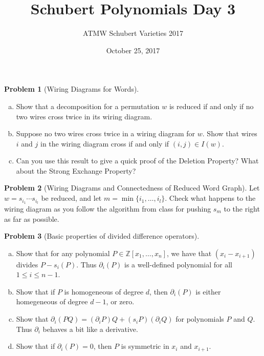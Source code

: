 \documentclass{amsart}
\newcommand{\+}[1]{\ensuremath{\mathbf{#1}}}
\theoremstyle{definition}
\newtheorem{prob}{Problem}
\begin{document}
\title{Schubert Polynomials Day 3}
\date{October 25, 2017}
\author{ATMW Schubert Varieties 2017}

\maketitle

\begin{prob}[Wiring Diagrams for Words]
\begin{enumerate}[(a)]
\item Show that a decomposition for a permutation $w$ is reduced if and only if no two wires cross twice in its wiring diagram.
\item Suppose no two wires cross twice in a wiring diagram for $w$.
Show that wires $i$ and $j$ in the wiring diagram cross if and only if $(i,j) \in I(w)$.
\item Can you use this result to give a quick proof of the Deletion Property? What about the Strong Exchange Property?
\end{enumerate}
\end{prob}


\begin{prob}[Wiring Diagrams and Connectedness of Reduced Word Graph]
Let $w = s_{i_1} \cdots s_{i_l}$ be reduced, and let $m = \min\{i_1,\ldots,i_l\}$.
Check what happens to the wiring diagram as you
follow the algorithm from class for pushing $s_m$ to the right as far as possible.
\end{prob}

\begin{prob}[Basic properties of divided difference operators]
 \begin{enumerate}[(a)]
  \item  Show that for any polynomial $P \in \mathbb{Z}[x_1,\ldots,x_n]$, we have that
 $(x_i - x_{i+1})$ divides $P - s_i(P)$.
Thus $\partial_i(P)$ is a well-defined polynomial for all $1 \leq i \leq n-1$.
\item Show that if $P$ is homogeneous of degree $d$, then $\partial_i(P)$ is 
either homegeneous of degree $d-1$, or zero.
\item Show that $\partial_i(PQ) = (\partial_iP)Q +(s_iP)(\partial_iQ)$ for polynomials $P$ and $Q$.
Thus $\partial_i$ behaves a bit like a derivative.
\item Show that if $\partial_i(P) = 0$, then $P$ is symmetric in $x_i$ and $x_{i+1}$.
 \end{enumerate}
\end{prob}
\end{document}
